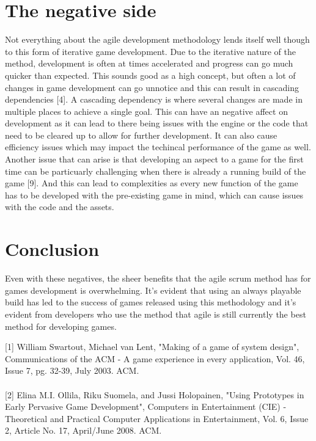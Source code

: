 \documentclass{article}
\begin{document}
\section{The negative side}
Not everything about the agile development methodology lends itself well though to this form of iterative game development. Due to the iterative nature of the method, development is often at times accelerated and progress can go much quicker than expected. This sounds good as a high concept, but often a lot of changes in game development can go unnotice and this can result in cascading dependencies [4]. A cascading dependency is where several changes are made in multiple places to achieve a single goal. This can have an negative affect on development as it can lead to there being issues with the engine or the code that need to be cleared up to allow for further development. It can also cause efficiency issues which may impact the techincal performance of the game as well. Another issue that can arise is that developing an aspect to a game for the first time can be particuarly challenging when there is already a running build of the game [9]. And this can lead to complexities as every new function of the game has to be developed with the pre-existing game in mind, which can cause issues with the code and the assets.
\section{Conclusion}
Even with these negatives, the sheer benefits that the agile scrum method has for games development is overwhelming. It's evident that using an always playable build has led to the success of games released using this methodology and it's evident from developers who use the method that agile is still currently the best method for developing games.

\newpage
{}

[1] William Swartout, Michael van Lent, "Making of a game of system design", Communications of the ACM - A game experience in every application, Vol. 46, Issue 7, pg. 32-39, July 2003. ACM.
\paragraph{}
[2] Elina M.I. Ollila, Riku Suomela, and Jussi Holopainen, "Using Prototypes in Early Pervasive Game Development", Computers in Entertainment (CIE) - Theoretical and Practical Computer Applications in Entertainment, Vol. 6, Issue 2, Article No. 17, April/June 2008. ACM.
\end{document}
